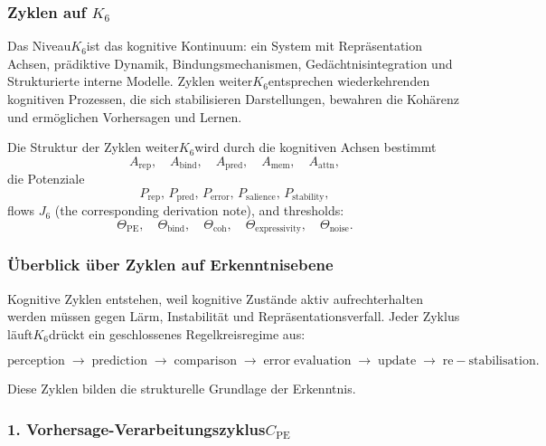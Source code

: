 
\subsubsection{Zyklen auf \texorpdfstring{$K_6$}{K_6}}
\label{sec:cycles-k6}

Das Niveau$K_6$ist das kognitive Kontinuum: ein System mit Repräsentation
Achsen, prädiktive Dynamik, Bindungsmechanismen, Gedächtnisintegration und
Strukturierte interne Modelle.
Zyklen weiter$K_6$entsprechen wiederkehrenden kognitiven Prozessen, die sich stabilisieren
Darstellungen, bewahren die Kohärenz und ermöglichen Vorhersagen und Lernen.

Die Struktur der Zyklen weiter$K_6$wird durch die kognitiven Achsen bestimmt
\[
 A_{\mathrm{rep}},\quad
 A_{\mathrm{bind}},\quad
 A_{\mathrm{pred}},\quad
 A_{\mathrm{mem}},\quad
 A_{\mathrm{attn}},
\]
die Potenziale
\[
 P_{\mathrm{rep}},\, P_{\mathrm{pred}},\, P_{\mathrm{error}},\,
 P_{\mathrm{salience}},\, P_{\mathrm{stability}},
\]
flows $J_6$ (the corresponding derivation note), and thresholds:
\[
 \Theta_{\mathrm{PE}},\quad
 \Theta_{\mathrm{bind}},\quad
 \Theta_{\mathrm{coh}},\quad
 \Theta_{\mathrm{expressivity}},\quad
 \Theta_{\mathrm{noise}}.
\]

\subsubsection{Überblick über Zyklen auf Erkenntnisebene}

Kognitive Zyklen entstehen, weil kognitive Zustände aktiv aufrechterhalten werden müssen
gegen Lärm, Instabilität und Repräsentationsverfall.
Jeder Zyklus läuft$K_6$drückt ein geschlossenes Regelkreisregime aus:

\[
  \mathrm{perception}
  \;\to\;
  \mathrm{prediction}
  \;\to\;
  \mathrm{comparison}
  \;\to\;
  \mathrm{error\;evaluation}
  \;\to\;
  \mathrm{update}
  \;\to\;
  \mathrm{re-stabilisation}.
\]

Diese Zyklen bilden die strukturelle Grundlage der Erkenntnis.

\subsubsection{1. Vorhersage-Verarbeitungszyklus$C_{\mathrm{PE}}$}

